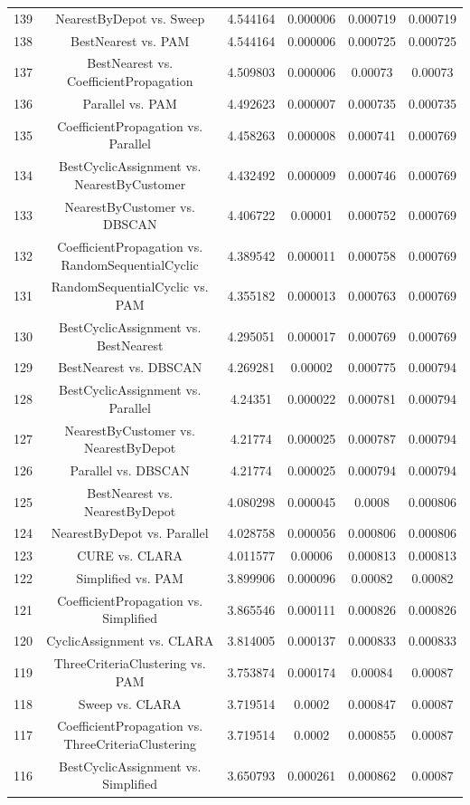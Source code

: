 \documentclass[a4paper,10pt]{article}
\begin{document}
\begin{landscape}
\begin{table}[!htp]
\begin{tabular}{cccccc}
139&NearestByDepot vs. Sweep&4.544164&0.000006&0.000719&0.000719\\
138&BestNearest vs. PAM&4.544164&0.000006&0.000725&0.000725\\
137&BestNearest vs. CoefficientPropagation&4.509803&0.000006&0.00073&0.00073\\
136&Parallel vs. PAM&4.492623&0.000007&0.000735&0.000735\\
135&CoefficientPropagation vs. Parallel&4.458263&0.000008&0.000741&0.000769\\
134&BestCyclicAssignment vs. NearestByCustomer&4.432492&0.000009&0.000746&0.000769\\
133&NearestByCustomer vs. DBSCAN&4.406722&0.00001&0.000752&0.000769\\
132&CoefficientPropagation vs. RandomSequentialCyclic&4.389542&0.000011&0.000758&0.000769\\
131&RandomSequentialCyclic vs. PAM&4.355182&0.000013&0.000763&0.000769\\
130&BestCyclicAssignment vs. BestNearest&4.295051&0.000017&0.000769&0.000769\\
129&BestNearest vs. DBSCAN&4.269281&0.00002&0.000775&0.000794\\
128&BestCyclicAssignment vs. Parallel&4.24351&0.000022&0.000781&0.000794\\
127&NearestByCustomer vs. NearestByDepot&4.21774&0.000025&0.000787&0.000794\\
126&Parallel vs. DBSCAN&4.21774&0.000025&0.000794&0.000794\\
125&BestNearest vs. NearestByDepot&4.080298&0.000045&0.0008&0.000806\\
124&NearestByDepot vs. Parallel&4.028758&0.000056&0.000806&0.000806\\
123&CURE vs. CLARA&4.011577&0.00006&0.000813&0.000813\\
122&Simplified vs. PAM&3.899906&0.000096&0.00082&0.00082\\
121&CoefficientPropagation vs. Simplified&3.865546&0.000111&0.000826&0.000826\\
120&CyclicAssignment vs. CLARA&3.814005&0.000137&0.000833&0.000833\\
119&ThreeCriteriaClustering vs. PAM&3.753874&0.000174&0.00084&0.00087\\
118&Sweep vs. CLARA&3.719514&0.0002&0.000847&0.00087\\
117&CoefficientPropagation vs. ThreeCriteriaClustering&3.719514&0.0002&0.000855&0.00087\\
116&BestCyclicAssignment vs. Simplified&3.650793&0.000261&0.000862&0.00087\\

\end{tabular}
\end{table}
\end{landscape}
\end{document}
